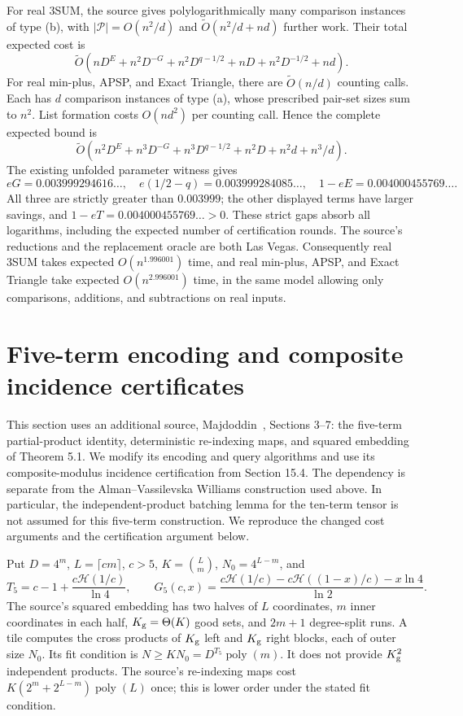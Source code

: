 \documentclass[11pt]{article}
\newcommand{\softO}{\widetilde O}
\newcommand{\HH}{\mathcal H}
\begin{document}
For real 3SUM, the source gives polylogarithmically many comparison
instances of type (b), with $|\mathcal P|=O(n^2/d)$ and
$\softO(n^2/d+nd)$ further work. Their total expected cost is
\[
\softO\left(nD^E+n^2D^{-G}+n^2D^{q-1/2}+nD+n^2D^{-1/2}+nd\right).
\]
For real min-plus, APSP, and Exact Triangle, there are
$\softO(n/d)$ counting calls. Each has $d$ comparison instances of
type (a), whose prescribed pair-set sizes sum to $n^2$. List formation
costs $O(nd^2)$ per counting call. Hence the complete expected bound is
\[
\softO\left(n^2D^E+n^3D^{-G}+n^3D^{q-1/2}
              +n^2D+n^2d+n^3/d\right).
\]
The existing unfolded parameter witness gives
\[
eG=0.003999294616\ldots,\quad
e(1/2-q)=0.003999284085\ldots,\quad
1-eE=0.004000455769\ldots.
\]
All three are strictly greater than $0.003999$; the other displayed
terms have larger savings, and $1-eT=0.004000455769\ldots>0$.
These strict gaps absorb all logarithms, including the expected number
of certification rounds. The source's reductions and the replacement
oracle are both Las Vegas. Consequently real 3SUM takes expected
$O(n^{1.996001})$ time, and real min-plus, APSP, and Exact Triangle take
expected $O(n^{2.996001})$ time, in the same model allowing only
comparisons, additions, and subtractions on real inputs.


\section{Five-term encoding and composite incidence certificates}
\label{sec:five-composite}
This section uses an additional source, Majdoddin~\cite{M26},
Sections 3--7: the five-term partial-product identity, deterministic
re-indexing maps, and squared embedding of Theorem 5.1. We modify its
encoding and query algorithms and use its composite-modulus incidence
certification from Section 15.4. The dependency is separate from the
Alman--Vassilevska Williams construction used above. In particular, the
independent-product batching lemma for the ten-term tensor is not assumed
for this five-term construction. We reproduce the changed cost arguments
and the certification argument below.

Put $D=4^m$, $L=\lceil cm\rceil$, $c>5$, $K=\binom Lm$,
$N_0=4^{L-m}$, and
\[
T_5=c-1+\frac{c\HH(1/c)}{\ln4},\qquad
G_5(c,x)=\frac{c\HH(1/c)-c\HH((1-x)/c)-x\ln4}{\ln2}.
\]
The source's squared embedding has two halves of $L$ coordinates, $m$
inner coordinates in each half, $K_{\rm g}=\Theta(K)$ good sets, and
$2m+1$ degree-split runs. A tile computes the cross products of
$K_{\rm g}$ left and $K_{\rm g}$ right blocks, each of outer size $N_0$.
Its fit condition is $N\ge KN_0=D^{T_5}\operatorname{poly}(m)$.
It does not provide $K_{\rm g}^2$ independent products. The source's
re-indexing maps cost $K(2^m+2^{L-m})\operatorname{poly}(L)$ once;
this is lower order under the stated fit condition.
\end{document}
